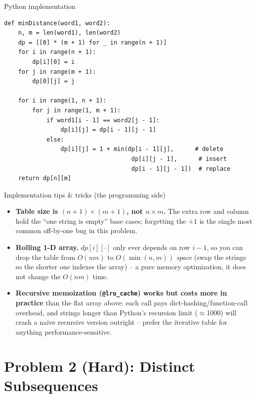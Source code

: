 \documentclass[11pt,aspectratio=169]{beamer}
\begin{document}
\begin{frame}[fragile]{Python implementation}
  \begin{lstlisting}[style=py]
def minDistance(word1, word2):
    n, m = len(word1), len(word2)
    dp = [[0] * (m + 1) for _ in range(n + 1)]
    for i in range(n + 1):
        dp[i][0] = i
    for j in range(m + 1):
        dp[0][j] = j

    for i in range(1, n + 1):
        for j in range(1, m + 1):
            if word1[i - 1] == word2[j - 1]:
                dp[i][j] = dp[i - 1][j - 1]
            else:
                dp[i][j] = 1 + min(dp[i - 1][j],      # delete
                                    dp[i][j - 1],      # insert
                                    dp[i - 1][j - 1])  # replace
    return dp[n][m]
  \end{lstlisting}
\end{frame}

\begin{frame}{Implementation tips \& tricks (the programming side)}
  \small
  \begin{itemize}
    \item \textbf{Table size is $(n{+}1)\times(m{+}1)$, not $n \times m$.} The extra row
    and column hold the ``one string is empty'' base cases; forgetting the $+1$ is the
    single most common off-by-one bug in this problem.
    \item \textbf{Rolling 1-D array.} $dp[i][\cdot]$ only ever depends on row $i-1$, so
    you can drop the table from $O(nm)$ to $O(\min(n,m))$ \emph{space} (swap the strings
    so the shorter one indexes the array) -- a pure memory optimization, it does not
    change the $O(nm)$ time.
    \item \textbf{Recursive memoization (\texttt{@lru\_cache}) works but costs more in
    practice} than the flat array above: each call pays dict-hashing/function-call
    overhead, and strings longer than Python's recursion limit ($\approx$1000) will
    crash a naive recursive version outright -- prefer the iterative table for anything
    performance-sensitive.
  \end{itemize}
\end{frame}

\section{Problem 2 (Hard): Distinct Subsequences}
\end{document}
